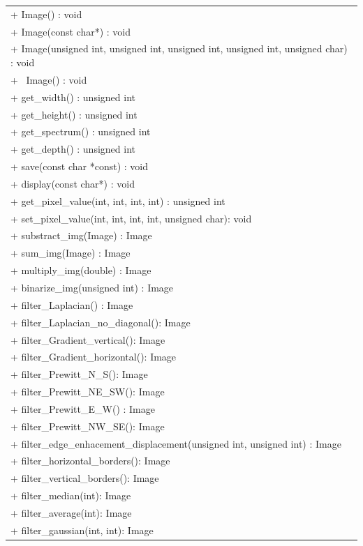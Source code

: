 \documentclass[a4paper]{article}
\begin{document}
\begin{table}[H]
\begin{tabular}[15cm]{ 
    >{\arraybackslash}m{15cm}}
        \midrule
        + Image() : void \\
        + Image(const char*) : void \\
        + Image(unsigned int, unsigned int, unsigned int, unsigned int, unsigned char) : void \\
        + ~Image() : void \\
        + get\_width() : unsigned int \\
        + get\_height() : unsigned int \\
        + get\_spectrum() : unsigned int \\
        + get\_depth() : unsigned int \\
        + save(const char *const) : void \\
		+ display(const char*) : void \\
        + get\_pixel\_value(int, int, int, int) : unsigned int \\
		+ set\_pixel\_value(int, int, int, int, unsigned char): void \\
        + substract\_img(Image) : Image \\
		+ sum\_img(Image) : Image \\
		+ multiply\_img(double) : Image \\
		+ binarize\_img(unsigned int) : Image \\
        + filter\_Laplacian() : Image \\
		+ filter\_Laplacian\_no\_diagonal(): Image	\\
        + filter\_Gradient\_vertical(): Image \\
		+ filter\_Gradient\_horizontal(): Image \\
		+ filter\_Prewitt\_N\_S(): Image 	\\
        + filter\_Prewitt\_NE\_SW(): Image\\
		+ filter\_Prewitt\_E\_W() : Image\\
        + filter\_Prewitt\_NW\_SE(): Image \\
        + filter\_edge\_enhacement\_displacement(unsigned int, unsigned int) : Image\\
        + filter\_horizontal\_borders(): Image \\
        + filter\_vertical\_borders(): Image \\
        + filter\_median(int): Image \\
        + filter\_average(int): Image \\
        + filter\_gaussian(int, int): Image \\

\end{tabular}
\end{table}
\end{document}
